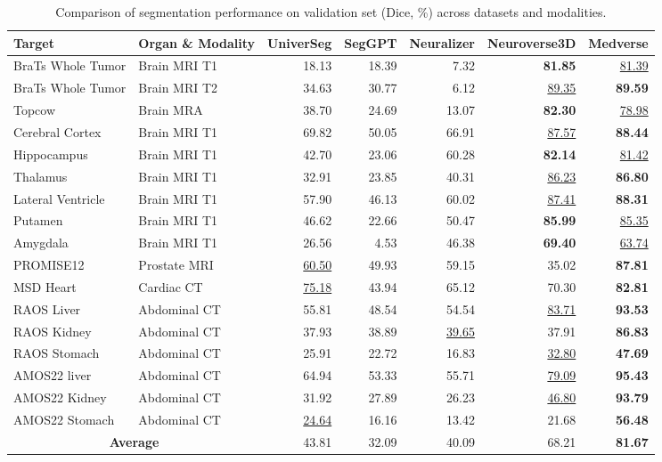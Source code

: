 \begin{table}[htbp]
\centering
\setlength{\tabcolsep}{5pt}
\begin{tabular}{l l r r r r r}
\toprule
\textbf{Target} & \textbf{Organ \& Modality} & \textbf{UniverSeg} & \textbf{SegGPT} & \textbf{Neuralizer} & \textbf{Neuroverse3D} & \textbf{Medverse} \\
\midrule
BraTs Whole Tumor            & Brain MRI T1        & 18.13 & 18.39 &  7.32 & \textbf{81.85} & \underline{81.39} \\
BraTs Whole Tumor           & Brain MRI T2       & 34.63 & 30.77 &  6.12 & \underline{89.35} & \textbf{89.59} \\
Topcow                      & Brain MRA      & 38.70 & 24.69 & 13.07 & \textbf{82.30} & \underline{78.98} \\
Cerebral Cortex   & Brain MRI T1  & 69.82 & 50.05 & 66.91 & \underline{87.57} & \textbf{88.44} \\
Hippocampus              & Brain MRI T1  & 42.70 & 23.06 & 60.28 & \textbf{82.14} & \underline{81.42} \\
Thalamus           & Brain MRI T1  & 32.91 & 23.85 & 40.31 & \underline{86.23} & \textbf{86.80} \\
Lateral Ventricle & Brain MRI T1  & 57.90 & 46.13 & 60.02 & \underline{87.41} & \textbf{88.31} \\
Putamen            & Brain MRI T1  & 46.62 & 22.66 & 50.47 & \textbf{85.99} & \underline{85.35} \\
Amygdala           & Brain MRI T1  & 26.56 & 4.53 & 46.38 & \textbf{69.40} & \underline{63.74} \\
PROMISE12                   & Prostate MRI      & \underline{60.50} & 49.93 & 59.15 & 35.02 & \textbf{87.81} \\
MSD Heart                  & Cardiac CT        & \underline{75.18} & 43.94 & 65.12 & 70.30 & \textbf{82.81} \\
RAOS Liver             & Abdominal CT      & 55.81 & 48.54 & 54.54 & \underline{83.71} & \textbf{93.53} \\
RAOS Kidney            & Abdominal CT      & 37.93 & 38.89 & \underline{39.65} & 37.91 & \textbf{86.83} \\
RAOS Stomach           & Abdominal CT      & 25.91 & 22.72 & 16.83 & \underline{32.80} & \textbf{47.69} \\
AMOS22 liver           & Abdominal CT      & 64.94 & 53.33 & 55.71 & \underline{79.09} & \textbf{95.43} \\
AMOS22 Kidney          & Abdominal CT      & 31.92 & 27.89 & 26.23 & \underline{46.80} & \textbf{93.79} \\
AMOS22 Stomach         & Abdominal CT      & \underline{24.64} & 16.16 & 13.42 & 21.68 & \textbf{56.48} \\
\midrule
\multicolumn{2}{c}{\textbf{Average}}                  & 43.81 & 32.09 & 40.09 & 68.21 & \textbf{81.67} \\
\bottomrule
\end{tabular}
\caption{Comparison of segmentation performance on validation set (Dice, \%) across datasets and modalities.}
\label{tab:more_seg_comparison}
\end{table}

